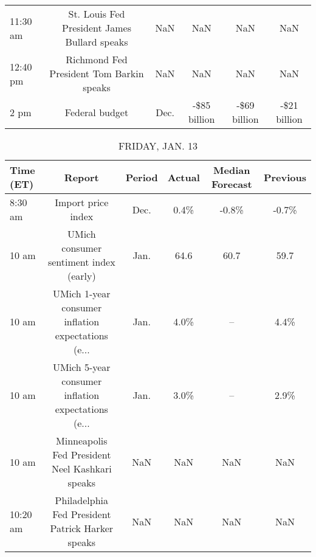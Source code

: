 \documentclass{article}%
\begin{document}
\begin{table}[htbp]
\begin{adjustbox}{width=1\textwidth}
\begin{tabular}{lccccc}
 11:30 am &     St. Louis Fed President James Bullard speaks &     NaN &          NaN &             NaN &          NaN \\
 12:40 pm &         Richmond Fed President Tom Barkin speaks &     NaN &          NaN &             NaN &          NaN \\
     2 pm &                                   Federal budget &    Dec. & -\$85 billion &    -\$69 billion & -\$21 billion \\
\bottomrule
\end{tabular}
%
\end{adjustbox}%
\end{table}

%


\begin{table}[htbp]%
\caption{FRIDAY, JAN. 13}%
\centering%
\begin{adjustbox}{width=1\textwidth}%
\begin{tabular}{lccccc}
\toprule
Time (ET) &                                             Report & Period & Actual & Median Forecast & Previous \\
\midrule
  8:30 am &                                 Import price index &   Dec. &   0.4\% &           -0.8\% &    -0.7\% \\
    10 am &             UMich consumer sentiment index (early) &   Jan. &   64.6 &            60.7 &     59.7 \\
    10 am & UMich 1-year consumer inflation expectations (e... &   Jan. &   4.0\% &              -- &     4.4\% \\
    10 am & UMich 5-year consumer inflation expectations (e... &   Jan. &   3.0\% &              -- &     2.9\% \\
    10 am &     Minneapolis Fed President Neel Kashkari speaks &    NaN &    NaN &             NaN &      NaN \\
 10:20 am &   Philadelphia Fed President Patrick Harker speaks &    NaN &    NaN &             NaN &      NaN \\
\bottomrule
\end{tabular}
%
\end{adjustbox}%
\end{table}
\end{document}
